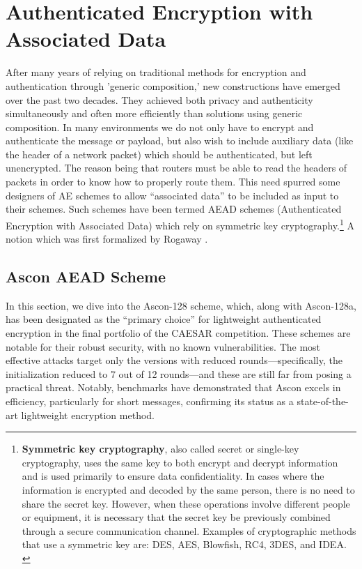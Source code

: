 \section{Authenticated Encryption with Associated Data}
After many years of relying on traditional methods for encryption and authentication through 'generic composition,' new constructions have emerged over the past two decades. They achieved both privacy and authenticity simultaneously and often more efficiently than solutions using generic composition.
\newline
In many environments we do not only have to encrypt and authenticate the message or payload, but also wish to include auxiliary data (like the header of a network packet) which should be authenticated, but left unencrypted. \cite[Chapter 1]{Black2005}
The reason being that routers must be able to read the headers of packets in order to know how to properly route them. This need spurred some designers of AE schemes to allow “associated data” to be included as input to their schemes. Such schemes have been termed AEAD schemes (Authenticated Encryption with Associated Data) which rely on symmetric key cryptography.\footnote[1]{\textbf{Symmetric key cryptography}, also called secret or single-key cryptography, uses the same key to both encrypt and decrypt information and is used primarily to ensure data confidentiality. In cases where the information is encrypted and decoded by the same person, there is no need to share the secret key. However, when these operations involve different people or equipment, it is necessary that the secret key be previously combined through a secure communication channel. Examples of cryptographic methods that use a symmetric key are: DES, AES, Blowfish, RC4, 3DES, and IDEA. \cite{Alencar2022Cryptography}}
A notion which was first formalized by Rogaway \cite{10.1145/586110.586125}.

\subsection{Ascon AEAD Scheme}
In this section, we dive into the Ascon-128 scheme, which, along with Ascon-128a, has been designated as the “primary choice” for lightweight authenticated encryption in the final portfolio of the CAESAR competition. These schemes are notable for their robust security, with no known vulnerabilities. The most effective attacks target only the versions with reduced rounds—specifically, the initialization reduced to 7 out of 12 rounds—and these are still far from posing a practical threat. Notably, benchmarks have demonstrated that Ascon excels in efficiency, particularly for short messages, confirming its status as a state-of-the-art lightweight encryption method. \cite[Chapter 1]{Ascon-v1.2}


